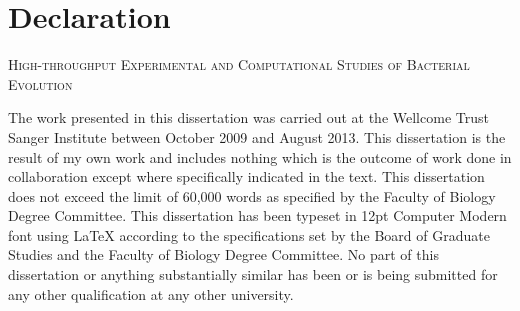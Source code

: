 
\chapter{Declaration}

%
\begin{center}
	\textsc{High-throughput Experimental and Computational Studies of Bacterial Evolution}
\end{center}

The work presented in this dissertation was carried out at the Wellcome Trust Sanger Institute between October 2009 and August 2013. This dissertation is the result of my own work and includes nothing which is the outcome of work done in collaboration except where specifically indicated in the text. This dissertation does not exceed the limit of 60,000 words as specified by the Faculty of Biology Degree Committee. This dissertation has been typeset in 12pt Computer Modern font using \LaTeX{} according to the specifications set by the Board of Graduate Studies and the Faculty of Biology Degree Committee. No part of this dissertation or anything substantially similar has been or is being submitted for any other qualification at any other university.
%


